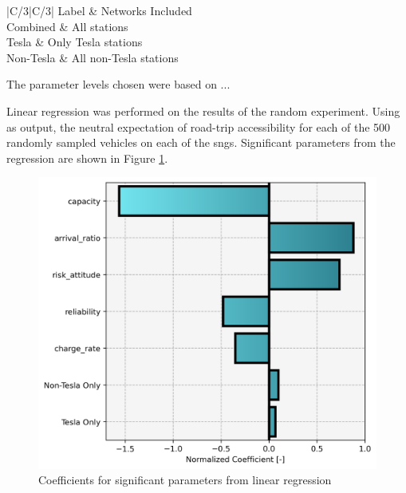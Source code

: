 \documentclass[11pt]{article}
\begin{document}
\begin{multicols}{2}
\begin{table}[H]
	\centering
	\caption{\glspl{sng} used in experiment.}
	\label{tab:experimental_sngs}
	\begin{tabular}{|C{\linewidth/3}|C{/3}|}
		\hline Label & Networks Included \\
		\hline Combined & All stations \\
		\hline Tesla & Only Tesla stations \\
		\hline Non-Tesla & All non-Tesla stations \\
		\hline
	\end{tabular}
\end{table}

The parameter levels chosen were based on ...

Linear regression was performed on the results of the random experiment. Using as output, the neutral expectation of road-trip accessibility for each of the 500 randomly sampled vehicles on each of the \glspl{sng}. Significant parameters from the regression are shown in Figure \ref{fig:significant_parameters}.

\begin{figure}[H]
	\centering
	\includegraphics[width = \linewidth]{figs/significant_parameters.png}
	\caption{Coefficients for significant parameters from linear regression}
	\label{fig:significant_parameters}
\end{figure}


\end{multicols}
\end{document}

